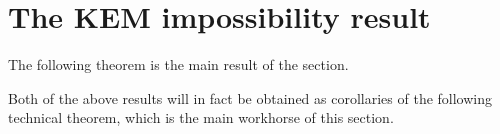 
\section{The KEM impossibility result}

The following theorem is the main result of the section.

\begin{theorem}\label{thm:main}
\end{theorem}


\begin{theorem}
\end{theorem}

Both of the above results will in fact be obtained as corollaries
of the following technical theorem, which is the main workhorse of this section.

